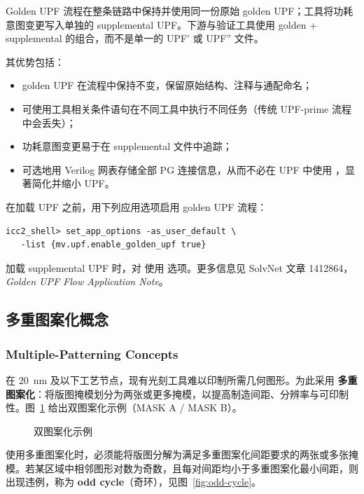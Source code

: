 Golden UPF 流程在整条链路中保持并使用同一份原始 golden UPF；工具将功耗意图变更写入单独的 supplemental UPF。下游与验证工具使用 golden + supplemental 的组合，而不是单一的 UPF' 或 UPF'' 文件。

其优势包括：
\begin{itemize}
  \item golden UPF 在流程中保持不变，保留原始结构、注释与通配命名；
  \item 可使用工具相关条件语句在不同工具中执行不同任务（传统 UPF-prime 流程中会丢失）；
  \item 功耗意图变更易于在 supplemental 文件中追踪；
  \item 可选地用 Verilog 网表存储全部 PG 连接信息，从而不必在 UPF 中使用 ，显著简化并缩小 UPF。
\end{itemize}

在加载 UPF 之前，用下列应用选项启用 golden UPF 流程：
\begin{lstlisting}
icc2_shell> set_app_options -as_user_default \
   -list {mv.upf.enable_golden_upf true}
\end{lstlisting}

加载 supplemental UPF 时，对  使用  选项。更多信息见 SolvNet 文章 1412864，\textit{Golden UPF Flow Application Note}。

\subsection{多重图案化概念}
\subsubsection*{Multiple-Patterning Concepts}

在 20~nm 及以下工艺节点，现有光刻工具难以印制所需几何图形。为此采用 \textbf{多重图案化}：将版图掩模划分为两张或更多掩模，以提高制造间距、分辨率与可印制性。图~\ref{fig:dp-example} 给出双图案化示例（MASK A / MASK B）。

\begin{figure}[htbp]
\centering
{}
\caption{双图案化示例}
\label{fig:dp-example}
\end{figure}

使用多重图案化时，必须能将版图分解为满足多重图案化间距要求的两张或多张掩模。若某区域中相邻图形对数为奇数，且每对间距均小于多重图案化最小间距，则出现违例，称为 \textbf{odd cycle}（奇环），见图~\ref{fig:odd-cycle}。

